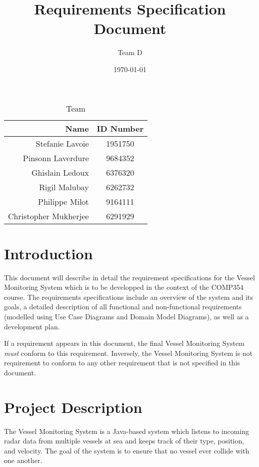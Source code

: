 \documentclass{article}
\begin{document}
\title{Requirements Specification Document}
\author{Team D}
\date{\today}

\maketitle

\vspace*{1.5in}
\begin{table}[htbp]
\caption{Team}
\begin{center}
\begin{tabular}{|r | c|}
\hline
Name & ID Number \\
\hline\hline
Stefanie Lavoie & 1951750 \\
Pinsonn Laverdure & 9684352 \\
Ghislain Ledoux & 6376320 \\
Rigil Malubay & 6262732 \\
Philippe Milot & 9164111 \\
Christopher Mukherjee & 6291929 \\
\hline
\end{tabular}
\end{center}
\end{table}

\clearpage

\section{Introduction}
This document will describe in detail the requirement specifications for the Vessel Monitoring System which is to be developped in the context of the COMP354 course. The requirements specifications include an overview of the system and its goals, a detailed description of all functional and non-functional requirements (modelled using Use Case Diagrams and Domain Model Diagrams), as well as a development plan. 

If a requirement appears in this document, the final Vessel Monitoring System \emph{must} conform to this requirement. Inversely, the Vessel Monitoring System is not requirement to conform to any other requirement that is not specified in this document.

\section{Project Description}
The Vessel Monitoring System is a Java-based system which listens to incoming radar data from multiple vessels at sea and keeps track of their type, position, and velocity. The goal of the system is to ensure that no vessel ever collide with one another.
\end{document}
